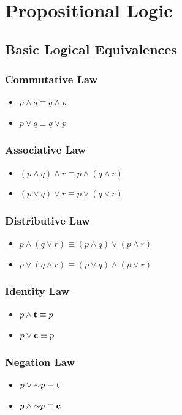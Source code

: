 \section{Propositional Logic}
\label{sec:propositional-logic}

\subsection{Basic Logical Equivalences}


\subsubsection{Commutative Law}
\begin{itemize}
  \item $p \wedge q \equiv q \wedge p$
  \item $p \vee q \equiv q \vee p$
\end{itemize}

\subsubsection{Associative Law}
\begin{itemize}
  \item $(p \wedge q) \wedge r \equiv p \wedge (q \wedge r)$
  \item $(p \vee q) \vee r \equiv p \vee (q \vee r)$
\end{itemize}

\subsubsection{Distributive Law}
\begin{itemize}
  \item $p \wedge (q \vee r) \equiv (p \wedge q) \vee (p \wedge r)$
  \item $p \vee (q \wedge r) \equiv (p \vee q) \wedge (p \vee r)$
\end{itemize}

\subsubsection{Identity Law}
\begin{itemize}
  \item $p \wedge \mathbf{t} \equiv p$
  \item $p \vee \mathbf{c} \equiv p$
\end{itemize}

\subsubsection{Negation Law}
\begin{itemize}
  \item $p \vee \mathord{\sim} p \equiv \mathbf{t}$
  \item $p \wedge \mathord{\sim} p \equiv \mathbf{c}$
\end{itemize}

